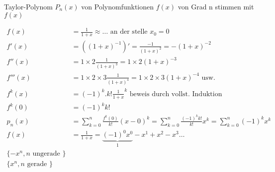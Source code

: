 \begin{remark}
Taylor-Polynom $P_n(x)$ von Polynomfunktionen $f(x)$ von Grad n stimmen mit  $f(x)$ 
\end{remark}

\begin{align*}
f(x) &= \frac{1}{1+x} \approx \dots \text{ an der stelle } x_0 = 0\\
f'(x) &= ((1+x)^{-1})' = \frac{-1}{(1+x)^2} = -(1+x)^{-2}\\
f''(x) &= 1 \times 2 \frac{1}{(1+x)^3} = 1 \times 2(1+x)^{-3}\\
f'''(x) &= 1 \times 2 \times 3 \frac{1}{(1+x)^4} = 
1 \times 2 \times 3 (1+x)^{-4} \text{ usw.}\\
f^k(x) &= (-1)^k.k!\frac{1}{1+x}^k \text{ beweis durch vollst. Induktion }\\
f^k(0) &= (-1)^k k!\\
p_n(x) &= \sum_{k=0}^{n}{\frac{f^k(0)}{k!}} (x-0)^k =
\sum_{k=0}^{n}{\frac{(-1)^k k!}{k!}} x^k = 
\sum_{k=0}^{n}{(-1)^k x^k}\\
f(x) &= \frac{1}{1+x} = \underbrace{(-1)^0 x^0}_{1}-x^1 + x^2 - x^3 \dots \\
\{ -x^n , n \text{ ungerade } \} \\
\{ x^n , n \text{ gerade } \}
\end{align*}



